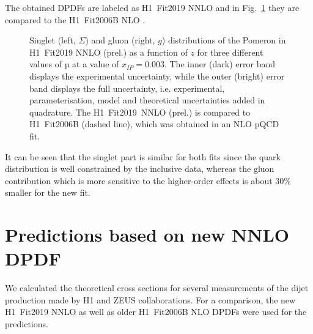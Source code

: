 \documentclass{PoS}
\newcommand{\IP}{I\!\!P}
\newcommand{\includegraphicss}[2][]{\fbox{\texttt{[image: \#2]}}}
\begin{document}
The obtained DPDFs are labeled as H1~Fit2019 NNLO and in Fig.~\ref{figDPDF} they are compared to the H1~Fit2006B NLO \cite{Aktas:2006hy}.
\begin{figure}[h]
\centering
\includegraphicss[trim={0cm 0.5cm 0 1.5cm},clip,width=.7\textwidth]{{{plots/H1prelim-19-013.fig1}}}
\caption{ Singlet (left, $\Sigma$) and gluon (right, $g$) distributions of the Pomeron in H1~Fit2019 NNLO (prel.) as a function of $z$ for three different values of $µ$ at a value of $x_{\IP} = 0.003$. The inner (dark) error band displays the experimental uncertainty, while the outer (bright) error band displays the full uncertainty, i.e. experimental, parameterisation, model and theoretical uncertainties added in quadrature. The H1~Fit2019~NNLO (prel.) is compared to H1~Fit2006B (dashed line), which was obtained in an NLO pQCD fit.}
\label{figDPDF}
\end{figure}
%
It can be seen that the singlet part is similar for both fits since the quark distribution is well constrained by the inclusive data, whereas the gluon contribution which is more sensitive to the higher-order effects is about 30\% smaller for the new fit.


\section{Predictions based on new NNLO DPDF}

We calculated the theoretical cross sections for several measurements of the dijet production made by H1 and ZEUS collaborations.
For a comparison, the new H1~Fit2019 NNLO as well as older H1~Fit2006B NLO DPDFs \cite{Aktas:2006hy} were used for the predictions.
\end{document}
